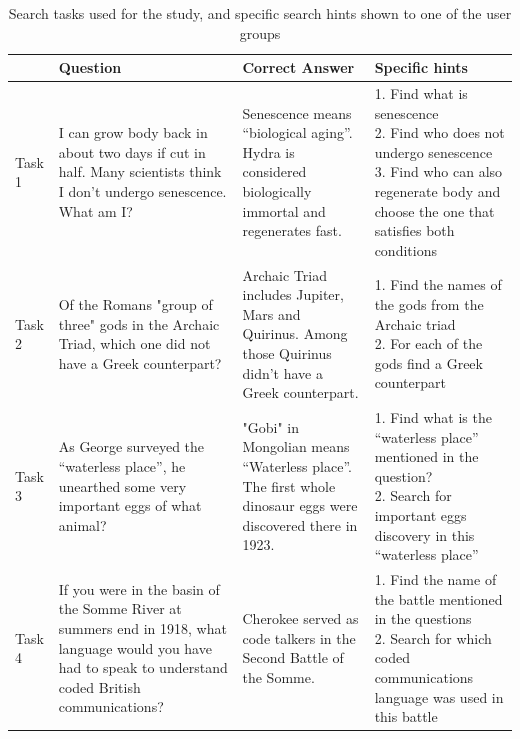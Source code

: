 \documentclass{sig-alternate}
\begin{document}
\begin{table}[tbh]
\centering
\caption{Search tasks used for the study, and specific search hints shown to one of the user groups}
\label{table:tasks}
\begin{tabular}{|p{1cm}|p{4.5cm}|p{4.2cm}|p{6.0cm}|} \hline
 & Question & Correct Answer & Specific hints \\ \hline
Task 1 & I can grow body back in about two days if cut in half. Many scientists think I don't undergo senescence. What am I? & Senescence means ``biological aging''. Hydra is considered biologically immortal and regenerates fast. & \parbox[t]{6cm}{
1. Find what is senescence\\
2. Find who does not undergo senescence\\
3. Find who can also regenerate body and choose the one that satisfies both conditions} \\ \hline
Task 2 & Of the Romans "group of three" gods in the Archaic Triad, which one did not have a Greek counterpart? & Archaic Triad includes Jupiter, Mars and Quirinus. Among those Quirinus didn't have a Greek counterpart. &
\parbox[t]{6cm}{
1. Find the names of the gods from the Archaic triad\\
2. For each of the gods find a Greek counterpart
}\\ \hline
Task 3 & As George surveyed the ``waterless place'', he unearthed some very important eggs of what animal? & "Gobi" in Mongolian means ``Waterless place''. The first whole dinosaur eggs were discovered there in 1923. & \parbox[t]{6cm}{
1. Find what is the ``waterless place'' mentioned in the question?\\
2. Search for important eggs discovery in this ``waterless place''}\\ \hline
Task 4 & If you were in the basin of the Somme River at summers end in 1918, what language would you have had to speak to understand coded British communications? & Cherokee served as code talkers in the Second Battle of the Somme. & \parbox[t]{6cm}{
1. Find the name of the battle mentioned in the questions\\
2. Search for which coded communications language was used in this battle\\
} \\ \hline
\end{tabular}
\end{table}
\end{document}
